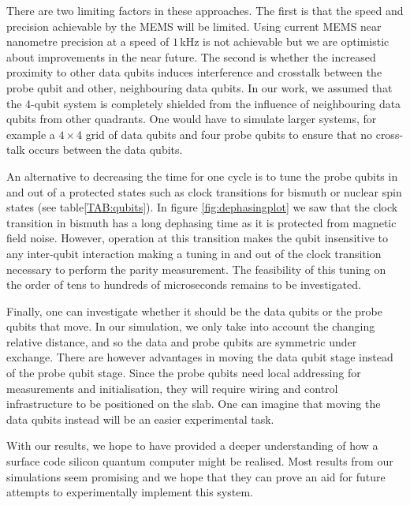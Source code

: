There are two limiting factors in these approaches. The first is that the speed and precision achievable by the MEMS will be limited. Using current MEMS near nanometre precision at a speed of $1\, $kHz \cite{Koo2012,Chu2003} is not achievable but we are optimistic about improvements in the near future. The second is whether the increased proximity to other data qubits induces interference and crosstalk between the probe qubit and other, neighbouring data qubits. In our work, we assumed that the 4-qubit system is completely shielded from the influence of neighbouring data qubits from other quadrants. One would have to simulate larger systems, for example a $4\times 4$ grid of data qubits and four probe qubits to ensure that no cross-talk occurs between the data qubits. 

An alternative to decreasing the time for one cycle is to tune the probe qubits in and out of a protected states such as clock transitions for bismuth or nuclear spin states (see table\@ \ref{TAB:qubits}). In figure \ref{fig:dephasingplot} we saw that the clock transition in bismuth has a long dephasing time as it is protected from magnetic field noise. However, operation at this transition makes the qubit insensitive to any inter-qubit interaction making a tuning in and out of the clock transition necessary to perform the parity measurement. The feasibility of this tuning on the order of tens to hundreds of microseconds remains to be investigated.

Finally, one can investigate whether it should be the data qubits or the probe qubits that  move. In our simulation, we only take into account the changing relative distance, and so the data and probe qubits are symmetric under exchange. There are however advantages in moving the data qubit stage instead of the probe qubit stage. Since the probe qubits need local addressing for measurements and initialisation, they will require wiring and control infrastructure to be positioned on the slab. One can imagine that moving the data qubits instead will be an easier experimental task. 

With our results, we hope to have provided a deeper understanding of how a surface code silicon quantum computer might be realised. Most results from our simulations seem promising and we hope that they can prove an aid for future attempts to experimentally implement this system. 













